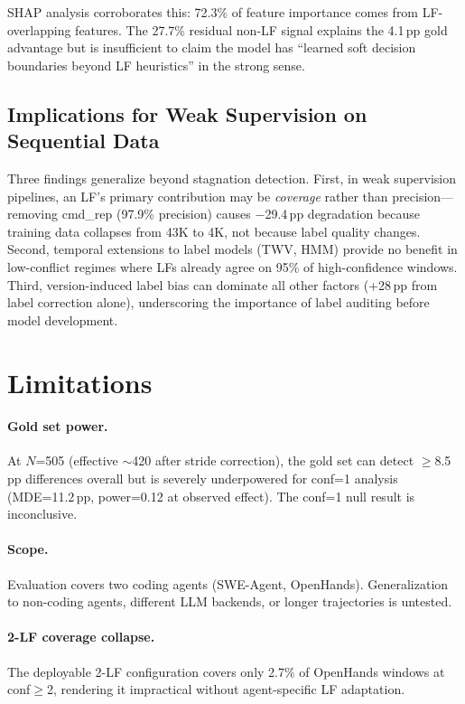 \documentclass[11pt,a4paper]{article}
\begin{document}
SHAP analysis corroborates this: 72.3\% of feature importance comes from LF-overlapping features.
The 27.7\% residual non-LF signal explains the 4.1\,pp gold advantage but is insufficient to claim the model has ``learned soft decision boundaries beyond LF heuristics'' in the strong sense.

\subsection{Implications for Weak Supervision on Sequential Data}

Three findings generalize beyond stagnation detection.
First, in weak supervision pipelines, an LF's primary contribution may be \emph{coverage} rather than precision---removing cmd\_rep (97.9\% precision) causes $-$29.4\,pp degradation because training data collapses from 43K to 4K, not because label quality changes.
Second, temporal extensions to label models (TWV, HMM) provide no benefit in low-conflict regimes where LFs already agree on 95\% of high-confidence windows.
Third, version-induced label bias can dominate all other factors (+28\,pp from label correction alone), underscoring the importance of label auditing before model development.

\section{Limitations}

\paragraph{Gold set power.}
At $N$=505 (effective $\sim$420 after stride correction), the gold set can detect $\geq$8.5\,pp differences overall but is severely underpowered for conf=1 analysis (MDE=11.2\,pp, power=0.12 at observed effect).
The conf=1 null result is inconclusive.

\paragraph{Scope.}
Evaluation covers two coding agents (SWE-Agent, OpenHands).
Generalization to non-coding agents, different LLM backends, or longer trajectories is untested.

\paragraph{2-LF coverage collapse.}
The deployable 2-LF configuration covers only 2.7\% of OpenHands windows at conf$\geq$2, rendering it impractical without agent-specific LF adaptation.
\end{document}
